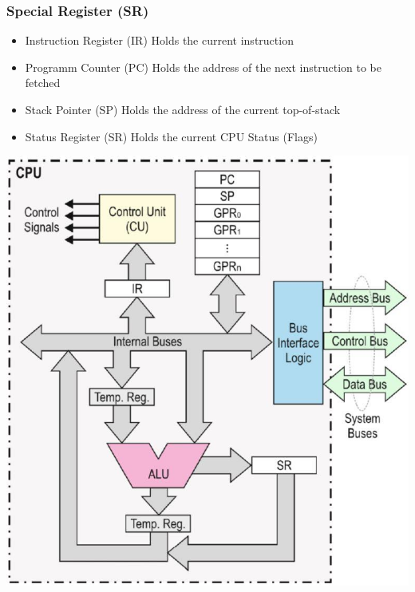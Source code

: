 \begin{multicols}{2}
	\subsubsection{Special Register (\acs{SR})}	
	\begin{itemize}
		\item Instruction Register (\acs{IR})
		\subitem Holds the current instruction 
		\item Programm Counter (\acs{PC})
		\subitem Holds the address of the next instruction to be fetched
		\item Stack Pointer (\acs{SP})
		\subitem Holds the address of the current top-of-stack 
		\item Status Register (\acs{SR})
		\subitem Holds the current \acs{CPU} Status (Flags)
	\end{itemize}
\vfill
\columnbreak
\begin{minipage}{\linewidth}
    \includegraphics[width=\linewidth]{images/CPUComponents}	
\end{minipage}


\end{multicols}
